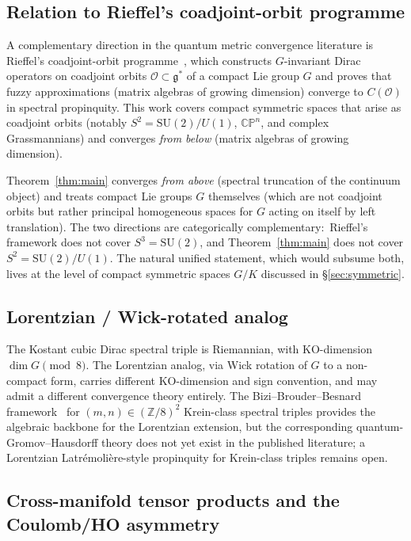 \documentclass[11pt,a4paper]{article}
\theoremstyle{plain}
\theoremstyle{definition}
\newcommand{\Z}{\mathbb{Z}}
\newcommand{\SU}{\mathrm{SU}}
\begin{document}
\subsection{Relation to Rieffel's coadjoint-orbit programme}\label{sec:rieffel}

A complementary direction in the quantum metric convergence literature
is Rieffel's coadjoint-orbit programme~\cite{rieffel2009, rieffel2023},
which constructs $G$-invariant Dirac operators on coadjoint orbits
$\mathcal{O} \subset \mathfrak{g}^*$ of a compact Lie group $G$ and
proves that fuzzy approximations (matrix algebras of growing
dimension) converge to $C(\mathcal{O})$ in spectral propinquity. This
work covers compact symmetric spaces that arise as coadjoint orbits
(notably $S^2 = \SU(2)/U(1)$, $\mathbb{CP}^n$, and complex Grassmannians)
and converges \emph{from below} (matrix algebras of growing dimension).

Theorem~\ref{thm:main} converges \emph{from above} (spectral truncation
of the continuum object) and treats compact Lie groups $G$ themselves
(which are not coadjoint orbits but rather principal homogeneous
spaces for $G$ acting on itself by left translation). The two
directions are categorically complementary:\ Rieffel's framework does
not cover $S^3 = \SU(2)$, and Theorem~\ref{thm:main} does not cover
$S^2 = \SU(2)/U(1)$. The natural unified statement, which would
subsume both, lives at the level of compact symmetric spaces $G/K$
discussed in \S\ref{sec:symmetric}.

\subsection{Lorentzian / Wick-rotated analog}\label{sec:lorentzian}

The Kostant cubic Dirac spectral triple is Riemannian, with
KO-dimension $\dim G \pmod 8$. The Lorentzian analog, via Wick rotation
of $G$ to a non-compact form, carries different KO-dimension and sign
convention, and may admit a different convergence theory entirely. The
Bizi--Brouder--Besnard framework~\cite{bizi_brouder_besnard2018} for
$(m, n) \in (\Z/8)^2$ Krein-class spectral triples provides the
algebraic backbone for the Lorentzian extension, but the corresponding
quantum-Gromov--Hausdorff theory does not yet exist in the published
literature; a Lorentzian Latr\'emoli\`ere-style propinquity for
Krein-class triples remains open.

\subsection{Cross-manifold tensor products and the Coulomb/HO
asymmetry}\label{sec:cross_manifold}
\end{document}

